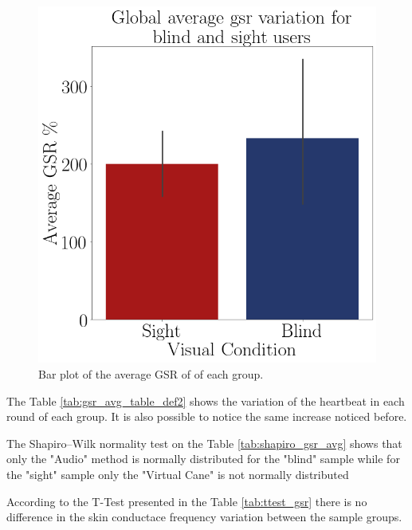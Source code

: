 \begin{figure}[!htb]
\begin{minipage}{.45\linewidth}
        \includegraphics[width = \linewidth]{Resultados/GSR/Figuras/png/barplot_gsr_avg.png}
        \caption{Bar plot of the average GSR of of each group.}
        \label{fig:barplot_gsr_avg}
    \end{minipage}
\end{figure}

The Table \ref{tab:gsr_avg_table_def2} shows the variation of the heartbeat in each round of each group. It is also possible to notice the same increase noticed before.



The Shapiro–Wilk normality test on the Table \ref{tab:shapiro_gsr_avg} shows that only the "Audio" method is normally distributed for the "blind" sample while for the "sight" sample only the "Virtual Cane" is not normally distributed

According to the T-Test presented in the Table \ref{tab:ttest_gsr} there is no difference in the skin conductace  frequency variation between the sample groups.


\begin{table}[!htb]
    \begin{minipage}{.45\linewidth}
        
    \end{minipage}
    \hfill
    \begin{minipage}{.45\linewidth}
        \vspace{-2.75cm}
        
    \end{minipage}
\end{table}

